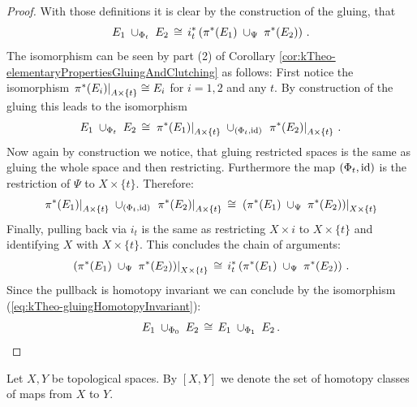 \begin{proof}
With those definitions it is clear by the construction of the gluing, that 
\begin{equation}\label{eq:kTheo-gluingHomotopyInvariant}
	E_1\;\cup_{\Phi_t} \; E_2\,\cong\, i_t^*\left(\pi^*(E_1) \;\cup_{\Psi} \; \pi^*(E_2)\right)\,.
\end{equation} The isomorphism can be seen by part (2) of Corollary  \ref{cor:kTheo-elementaryPropertiesGluingAndClutching} as follows:
First notice the isomorphism $\left.\pi^*(E_i)\right|_{A\times \{t\}}\cong E_i$ for $i=1,2$ and any $t$. By construction of the gluing this leads to the isomorphism 
\begin{equation*}
		E_1 \;\cup_{\Phi_t} \; E_2\,\cong\,	\left.\pi^*(E_1)\right|_{A\times \{t\}}  \;\cup_{(\Phi_t,\operatorname{\mathrm{id}})} \; \left.\pi^*(E_2)\right|_{A\times \{t\}}\,.
\end{equation*} Now again by construction we notice, that gluing restricted spaces is the same as gluing the whole space and then restricting. Furthermore the map $(\Phi_t,\operatorname{\mathrm{id}})$ is the restriction of $\Psi$ to $X\times\{t\}$. Therefore: 
\begin{equation*}
	\left.\pi^*(E_1)\right|_{A\times \{t\}}  \;\cup_{(\Phi_t,\operatorname{\mathrm{id}})} \;  \left.\pi^*(E_2)\right|_{A\times \{t\}}\,\cong \, 	\left.\left(\pi^*(E_1) \;\cup_{\Psi} \; \pi^*(E_2)\right)\right|_{X\times\{t\}}
\end{equation*} Finally, pulling back via $i_t$ is the same as restricting $X\times i$ to $X\times \{t\}$ and identifying $X$ with $X\times \{t\}$. This concludes the chain of arguments:
\begin{equation*}
	\left.\left(\pi^*(E_1) \;\cup_{\Psi} \; \pi^*(E_2)\right)\right|_{X\times\{t\}} \, \cong \,
	i_t^*\left(\pi^*(E_1)   \;\cup_{\Psi} \; \pi^*(E_2)\right)\,.
\end{equation*}
Since the pullback is homotopy invariant we can conclude by the isomorphism (\ref{eq:kTheo-gluingHomotopyInvariant}):
\begin{equation*}
	E_1 \;\cup_{\Phi_0} \; E_2\,\cong\,E_1 \;\cup_{\Phi_1} \; E_2\,.
\end{equation*}
\end{proof}
\begin{definition}\label{def:kTheo-homotopyClassesOfMaps}
	Let $X,Y$ be topological spaces. By $[X,Y]$ we denote the set of homotopy classes of maps from $X$ to $Y$.
\end{definition}


